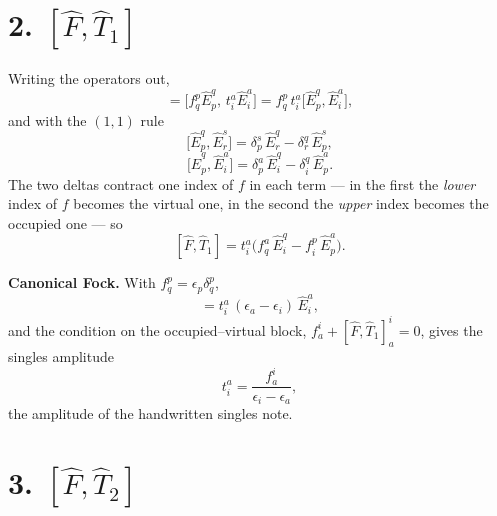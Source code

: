 \documentclass[11pt]{article}
\newcommand{\E}[2]{\hat E^{#1}_{#2}}
\newcommand{\occ}{i}
\newcommand{\vir}{a}
\begin{document}
\section*{2. \texorpdfstring{$[\hat F,\hat T_1]$}{[F,T1]}}

Writing the operators out,
\begin{equation}
  [\hat F,\hat T_1]
   =\bigl[f^p_q\E{q}{p},\,t^\vir_\occ\E{\vir}{\occ}\bigr]
   =f^p_q\,t^\vir_\occ\bigl[\E{q}{p},\E{\vir}{\occ}\bigr],
  \label{eq:t1setup}
\end{equation}
and with the $(1,1)$ rule
\begin{equation}
  \bigl[\E{q}{p},\E{s}{r}\bigr]
   =\delta^s_p\,\E{q}{r}-\delta^q_r\,\E{s}{p},
  \label{eq:c11}
\end{equation}
\begin{equation}
  \bigl[\E{q}{p},\E{\vir}{\occ}\bigr]
   =\delta^\vir_p\,\E{q}{\occ}-\delta^q_\occ\,\E{\vir}{p}.
  \label{eq:c11apply}
\end{equation}
The two deltas contract one index of $f$ in each term --- in the first the
\emph{lower} index of $f$ becomes the virtual one, in the second the
\emph{upper} index becomes the occupied one --- so
\begin{equation}
  \boxed{\;[\hat F,\hat T_1]
   =t^\vir_\occ\bigl(f^\vir_q\,\E{q}{\occ}-f^p_\occ\,\E{\vir}{p}\bigr).\;}
  \label{eq:FT1}
\end{equation}

\noindent\textbf{Canonical Fock.} With $f^p_q=\epsilon_p\delta^p_q$,
\begin{equation}
  [\hat F,\hat T_1]=t^\vir_\occ\,(\epsilon_\vir-\epsilon_\occ)\,\E{\vir}{\occ},
  \label{eq:FT1canon}
\end{equation}
and the condition on the occupied--virtual block,
$f^\occ_\vir+[\hat F,\hat T_1]^\occ_\vir=0$, gives the singles amplitude
\begin{equation}
  t^\vir_\occ=\frac{f^\occ_\vir}{\epsilon_\occ-\epsilon_\vir},
\end{equation}
the amplitude of the handwritten singles note.

\section*{3. \texorpdfstring{$[\hat F,\hat T_2]$}{[F,T2]}}
\end{document}
